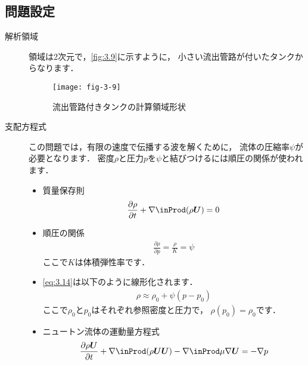 \subsection{問題設定}
\label{ssec:3.4.1}
\begin{description}
 \item[解析領域] 領域は2次元で，\autoref{fig:3.9}に示すように，
            小さい流出管路が付いたタンクからなります．


\begin{figure}[ht]
 \texttt{[image: fig-3-9]}
 \caption{流出管路付きタンクの計算領域形状}
 \label{fig:3.9}
\end{figure}


 \item[支配方程式] この問題では，有限の速度で伝播する波を解くために，
            流体の圧縮率$\psi$が必要となります．
            密度$\rho$と圧力$p$を$\psi$と結びつけるには順圧の関係が使われます．
            \begin{itemize}
             \item 質量保存則
                   \begin{align}
                    \label{eq:3.13}
                    \frac{\partial\rho}{\partial t}
                    + \nabla \inProd (\rho\bm{U}) = 0
                   \end{align}
             \item 順圧の関係
                   \begin{align}
                    \label{eq:3.14}
                    \frac{\partial\rho}{\partial p}
                    = \frac{\rho}{K} = \psi
                   \end{align}
                   ここで$K$は体積弾性率です．
             \item \autoref{eq:3.14}は以下のように線形化されます．
                   \begin{align}
                    \label{eq:3.15}
                    \rho \approx \rho_{0} + \psi (p - p_{0})
                   \end{align}
                   ここで$\rho_{0}$と$p_{0}$はそれぞれ参照密度と圧力で，
                   $\rho(p_{0}) = \rho_{0}$です．
             \item ニュートン流体の運動量方程式
                   \begin{align}
                    \label{eq:3.16}
                    \frac{\partial\rho\bm{U}}{\partial t}
                    + \nabla \inProd (\rho\bm{U}\bm{U})
                    - \nabla \inProd \mu\nabla\bm{U}
                    = -\nabla p

\end{align}
\end{itemize}
\end{description}
